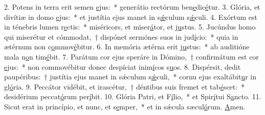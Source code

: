 2. Potens in terra erit semen \uline{e}jus:~* generátio rectórum ben\uline{e}dic\uline{é}tur.
3. Glória, et divítiæ in domo \uline{e}jus:~* et justítia ejus manet in s\uline{ǽ}culum s\uline{ǽ}culi.
4. Exórtum est in ténebris lumen r\uline{e}ctis:~* miséricors, et miser\uline{á}tor, et j\uline{u}stus.
5. Jucúndus homo qui miserétur et cómmodat,~† dispónet sermónes suos in jud\uline{í}cio:~* quia in ætérnum non c\uline{o}mmov\uline{é}bitur.
6. In memória ætérna erit j\uline{u}stus:~* ab auditióne mala n\uline{o}n tim\uline{é}bit.
7. Parátum cor ejus speráre in Dómino,~† confirmátum est cor \uline{e}jus:~* non commovébitur donec despíciat inim\uline{í}cos s\uline{u}os.
8. Dispérsit, dedit paupéribus:~† justítia ejus manet in sǽculum s\uline{ǽ}culi,~* cornu ejus exaltábit\uline{u}r in gl\uline{ó}ria.
9. Peccátor vidébit, et irascétur,~† déntibus suis fremet et tab\uline{é}scet:~* desidérium peccat\uline{ó}rum per\uline{í}bit.
10. Glória Patri, et F\uline{í}lio,~* et Spir\uline{í}tui S\uline{a}ncto.
11. Sicut erat in princípio, et nunc, et s\uline{e}mper,~* et in sǽcula sæcul\uline{ó}rum. \uline{A}men.

